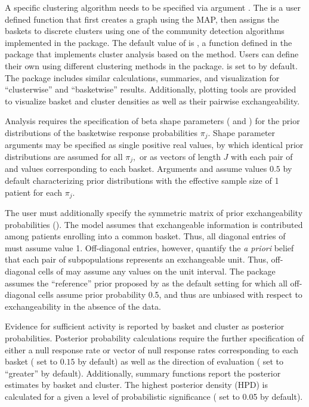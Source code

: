 A specific clustering algorithm needs to be specified via argument . The  is a user defined function that first creates a graph using the MAP, then assigns the baskets to discrete clusters using one of the community detection algorithms implemented in the  package. The default value of  is , a function defined in the  package that implements cluster analysis based on the  method. Users can define their own  using different clustering methods in the  package.  is set to  by default. The package includes similar calculations, summaries, and visualization for ``clusterwise'' and ``basketwise'' results. Additionally, plotting tools are provided to visualize basket and cluster densities as well as their pairwise exchangeability.

Analysis requires the specification of beta shape parameters ( and ) for the prior distributions of the basketwise response probabilities $\pi_j.$  Shape parameter arguments may be specified as single positive real values, by which identical prior distributions are assumed for all $\pi_j,$ or as vectors of length $J$ with each pair of  and  values corresponding to each basket. Arguments  and  assume values $0.5$ by default characterizing prior distributions with the effective sample size of 1 patient for each $\pi_j.$

The user must additionally specify the symmetric matrix of prior exchangeability probabilities (). The model assumes that exchangeable information is contributed among patients enrolling into a common basket. Thus, all diagonal entries of  must assume value 1. Off-diagonal entries, however, quantify the \emph{a priori} belief that each pair of subpopulations represents an exchangeable unit. Thus, off-diagonal cells of  may assume any values on the unit interval. The  package assumes the ``reference'' prior proposed by \cite{hobbs2018monitor} as the default setting for which all off-diagonal cells assume prior probability 0.5, and thus are unbiased with respect to exchangeability in the absence of the data.

Evidence for sufficient activity is reported by basket and cluster as posterior probabilities. Posterior probability calculations require the further specification of either a null response rate or vector of null response rates corresponding to each basket ( set to $0.15$ by default) as well as the direction of evaluation ( set to ``greater'' by default). Additionally, summary functions report the posterior estimates by basket and cluster. The highest posterior density (HPD) is calculated for a given a level of probabilistic significance ( set to 0.05 by default).

